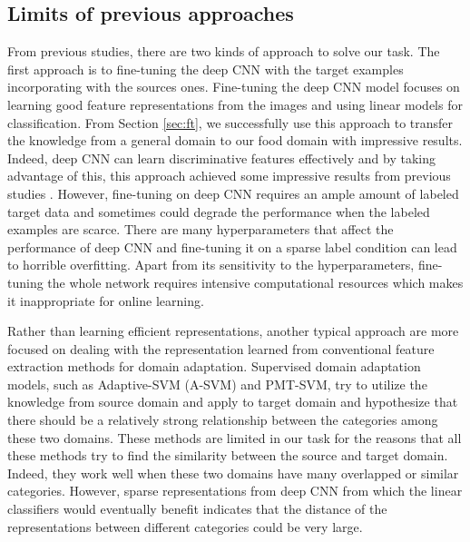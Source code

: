 \subsection{Limits of previous approaches}
From previous studies, there are two kinds of approach to solve our task. The first approach is to fine-tuning the deep CNN with the target examples incorporating with the sources ones.
Fine-tuning the deep CNN model focuses on learning good feature representations from the images and using linear models for classification. From Section \ref{sec:ft}, we successfully use this approach to transfer the knowledge from a general domain to our food domain with impressive results. Indeed, deep CNN can learn discriminative features effectively and by taking advantage of this, this approach achieved some impressive results from previous studies\cite{Chatfield14} \cite{zeiler2014visualizing}. However, fine-tuning on deep CNN requires an ample amount of labeled target data and sometimes could degrade the performance when the labeled examples are scarce\cite{hoffman2013one}. There are many hyperparameters that affect the performance of deep CNN and fine-tuning it on a sparse label condition can lead to horrible overfitting. Apart from its sensitivity to the hyperparameters, fine-tuning the whole network requires intensive computational resources which makes it inappropriate for online learning.

Rather than learning efficient representations, another typical approach are more focused on dealing with the representation learned from conventional feature extraction methods for domain adaptation.
Supervised domain adaptation models, such as Adaptive-SVM (A-SVM) and PMT-SVM, try to utilize the knowledge from source domain and apply to target domain and hypothesize that there should be a relatively strong relationship between the categories among these two domains\cite{yang2007adapting}\cite{aytar2011tabula}. These methods are limited in our task for the reasons that all these methods try to find the similarity between the source and target domain. Indeed, they work well when these two domains have many overlapped or similar categories. However, sparse representations from deep CNN from which the linear classifiers would eventually benefit indicates that the distance of the representations between different categories could be very large.

